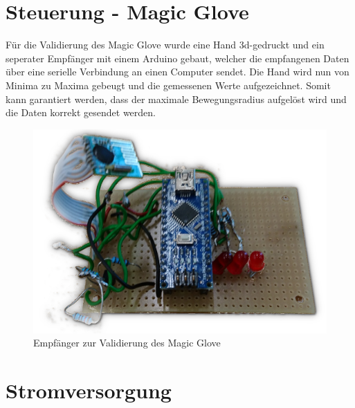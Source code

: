 \section{Steuerung - Magic Glove} \label{ValidSteuerMagicGlove}
Für die Validierung des Magic Glove wurde eine Hand 3d-gedruckt und ein seperater Empfänger mit einem Arduino gebaut, welcher die empfangenen Daten über eine serielle Verbindung an einen Computer sendet. Die Hand wird nun von Minima zu Maxima gebeugt und die gemessenen Werte aufgezeichnet. Somit kann garantiert werden, dass der maximale Bewegungsradius aufgelöst wird und die Daten korrekt gesendet werden.
\begin{figure} [H]
	\centering
	\includegraphics[scale=0.2]{images/receiver}
	\caption{Empfänger zur Validierung des Magic Glove}
	\label{fig:statediagrammbatterie}
\end{figure}
\section{Stromversorgung} \label{ValidStromversorgung}

